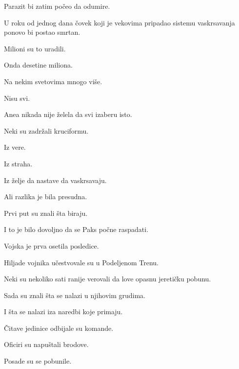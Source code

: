 Parazit bi zatim počeo da odumire.

\bigskip

U roku od jednog dana čovek koji je vekovima pripadao sistemu vaskrsavanja ponovo bi postao smrtan.

\bigskip

Milioni su to uradili.

\bigskip

Onda desetine miliona.

\bigskip

Na nekim svetovima mnogo više.

\bigskip

Nisu svi.

\bigskip

Anea nikada nije želela da svi izaberu isto.

\bigskip

Neki su zadržali kruciformu.

Iz vere.

Iz straha.

Iz želje da nastave da vaskrsavaju.

\bigskip

Ali razlika je bila presudna.

\bigskip

Prvi put su znali šta biraju.

\bigskip

I to je bilo dovoljno da se Paks počne raspadati.

\bigskip

Vojska je prva osetila posledice.

\bigskip

Hiljade vojnika učestvovale su u Podeljenom Trenu.

\bigskip

Neki su nekoliko sati ranije verovali da love opasnu jeretičku pobunu.

\bigskip

Sada su znali šta se nalazi u njihovim grudima.

\bigskip

I šta se nalazi iza naredbi koje primaju.

\bigskip

Čitave jedinice odbijale su komande.

\bigskip

Oficiri su napuštali brodove.

Posade su se pobunile.

\bigskip

